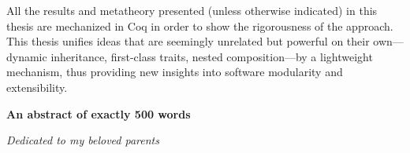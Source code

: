 All the results and metatheory presented (unless otherwise indicated) in this
thesis are mechanized in Coq in order to show the rigorousness of the approach.
This thesis unifies ideas that are seemingly unrelated but powerful on their
own---dynamic inheritance, first-class traits, nested composition---by a
lightweight mechanism, thus providing new insights into software modularity and
extensibility.

\vspace{1.5\baselineskip}

\noindent\makebox[\linewidth]{\rule{0.7\textwidth}{0.4pt}}

\begin{center}
\textbf{An abstract of exactly 500 words}
\end{center}

\newpage

\begin{flushright}
  \null{}
  \textit{Dedicated to my beloved parents}
  \null
\end{flushright}

